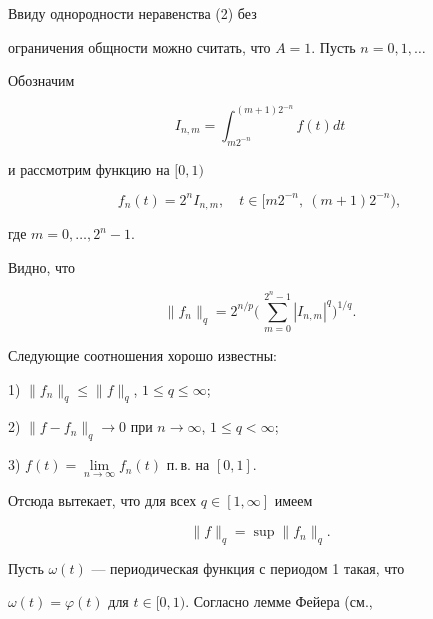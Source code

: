 \begin{pf} Ввиду однородности неравенства (2) без  


ограничения общности можно считать, что $A=1$. Пусть $n=0,1,\dotsc$ 


Обозначим 


\begin{equation} 


I_{n,m}=\int^{(m+1)2^{-n}}_{m2^{-n}}f(t)dt 


\end{equation} 


и рассмотрим функцию на $[0,1)$ 


$$ 


f_n(t)=2^n I_{n,m},\quad t\in[m2^{-n},\ (m+1)2^{-n}), 


$$ 


где $m=0,\dotsc,2^n-1$.  


Видно, что 


\begin{equation} 


\|f_n\|_q=2^{n/p}\bigg(\,\sum^{2^n-1}_{m=0} 


|I_{n,m}|^q\bigg)^{1/q}. 


\end{equation} 


Следующие соотношения хорошо известны: 


 


1) $\|f_n\|_q\le\|f\|_q$, $1\le q\le\infty$; 


 


2) $\|f-f_n\|_q\to 0$ при $n\to\infty$, $1\le q<\infty$; 


 


3) $f(t)=\lim\limits_{n\to\infty}f_n(t)$ п.\,в. на $[0,1]$. 


 


\noindent Отсюда вытекает, что для всех $q\in[1,\infty]$ имеем  


\begin{equation} 


\|f\|_q=\sup\|f_n\|_q. 


\end{equation} 


Пусть $\omega(t)$ --- периодическая функция с периодом 1 такая, что  


$\omega(t)=\varphi(t)$ для $t\in[0,1)$. Согласно лемме Фейера (см., 



\end{pf}
